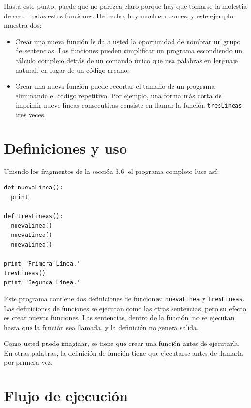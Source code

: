 Hasta este punto, puede que no parezca claro porque hay que tomarse la molestia
de crear todas estas funciones. De hecho, hay muchas razones, y este ejemplo 
muestra dos:

\begin{itemize}

\item Crear una nueva función le da a usted la oportunidad de nombrar un
grupo de sentencias. Las funciones pueden simplificar un programa escondiendo
un cálculo complejo detrás de un comando único que usa palabras en lenguaje
natural, en lugar de un código arcano.

\item Crear una nueva función puede recortar el tamaño de un programa eliminando
el código repetitivo. Por ejemplo, una forma más corta de imprimir nueve
líneas consecutivas consiste en llamar la función \texttt{tresLineas} tres veces.

\end{itemize}



\section{Definiciones y uso}

Uniendo los fragmentos de la sección 3.6, el programa completo luce así:

\beforeverb
\begin{verbatim}
def nuevaLinea():
  print

def tresLineas():
  nuevaLinea()
  nuevaLinea()
  nuevaLinea()

print "Primera Línea."
tresLineas()
print "Segunda Línea."
\end{verbatim}
\afterverb
%
Este programa contiene dos definiciones de funciones: \texttt{nuevaLinea} y
\texttt{tresLineas}.  Las definiciones de funciones se ejecutan como 
las otras sentencias, pero su efecto es crear nuevas funciones. Las
sentencias, dentro de la función, no se ejecutan hasta que la función
sea llamada, y la definición no genera salida.

Como usted puede imaginar, se tiene que crear una función antes de
ejecutarla. En otras palabras, la definición de función tiene que
ejecutarse antes de llamarla por primera vez.



\section{Flujo de ejecución}


